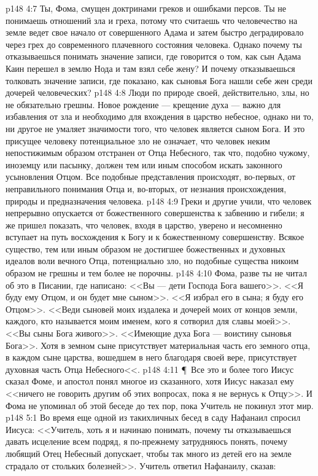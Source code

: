 \vs p148 4:7 Ты, Фома, смущен доктринами греков и ошибками персов. Ты не понимаешь отношений зла и греха, потому что считаешь что человечество на земле ведет свое начало от совершенного Адама и затем быстро деградировало через грех до современного плачевного состояния человека. Однако почему ты отказываешься понимать значение записи, где говорится о том, как сын Адама Каин перешел в землю Нода и там взял себе жену? И почему отказываешься толковать значение записи, где показано, как сыновья Бога нашли себе жен среди дочерей человеческих?
\vs p148 4:8 Люди по природе своей, действительно, злы, но не обязательно грешны. Новое рождение --- крещение духа --- важно для избавления от зла и необходимо для вхождения в царство небесное, однако ни то, ни другое не умаляет значимости того, что человек является сыном Бога. И это присущее человеку потенциальное зло не означает, что человек неким непостижимым образом отстранен от Отца Небесного, так что, подобно чужому, иноземцу или пасынку, должен тем или иным способом искать законного усыновления Отцом. Все подобные представления происходят, во\hyp{}первых, от неправильного понимания Отца и, во\hyp{}вторых, от незнания происхождения, природы и предназначения человека.
\vs p148 4:9 Греки и другие учили, что человек непрерывно опускается от божественного совершенства к забвению и гибели; я же пришел показать, что человек, входя в царство, уверено и несомненно вступает на путь восхождения к Богу и к божественному совершенству. Всякое существо, тем или иным образом не достигшее божественных и духовных идеалов воли вечного Отца, потенциально зло, но подобные существа никоим образом не грешны и тем более не порочны.
\vs p148 4:10 Фома, разве ты не читал об это в Писании, где написано: <<Вы --- дети Господа Бога вашего>>. <<Я буду ему Отцом, и он будет мне сыном>>. <<Я избрал его в сына; я буду его Отцом>>. <<Веди сыновей моих издалека и дочерей моих от концов земли, каждого, кто называется моим именем, кого я сотворил для славы моей>>. <<Вы сыны Бога живого>>. <<Имеющие духа Бога --- воистину сыновья Бога>>. Хотя в земном сыне присутствует материальная часть его земного отца, в каждом сыне царства, вошедшем в него благодаря своей вере, присутствует духовная часть Отца Небесного<<.
\vs p148 4:11 \P\ Все это и более того Иисус сказал Фоме, и апостол понял многое из сказанного, хотя Иисус наказал ему <<ничего не говорить другим об этих вопросах, пока я не вернусь к Отцу>>. И Фома не упоминал об этой беседе до тех пор, пока Учитель не покинул этот мир.
\vs p148 5:1 Во время еще одной из такихличных бесед в саду Нафанаил спросил Иисуса: <<Учитель, хоть я и начинаю понимать, почему ты отказываешься давать исцеление всем подряд, я по\hyp{}прежнему затрудняюсь понять, почему любящий Отец Небесный допускает, чтобы так много из детей его на земле страдало от стольких болезней>>. Учитель ответил Нафанаилу, сказав:
